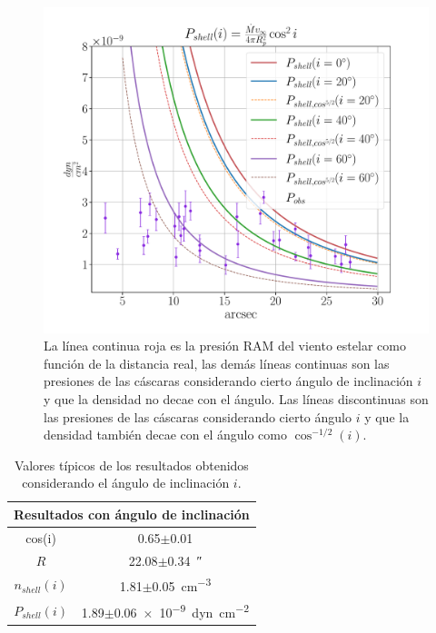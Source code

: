 \documentclass{book}
\begin{document}
\begin{figure}[htb]
    \centering
    \includegraphics[width=\textwidth]{ultimos/R_1_cos2(1).pdf}
    \caption{La línea continua roja es la presión RAM del viento estelar como función de la distancia real, las demás líneas continuas son las presiones de las cáscaras considerando cierto ángulo de inclinación $i$ y que la densidad no decae con el ángulo. Las líneas discontinuas son las presiones de las cáscaras considerando cierto ángulo $i$ y que la densidad también decae con el ángulo como $\cos^{-1/2}(i)$.}
    \label{fig:ncos_2}
\end{figure}

\begin{table}[htb]
    \centering
    \begin{tabular}{c c}
        \toprule
        \multicolumn{2}{c}{Resultados con ángulo de inclinación} \\ \midrule
         cos(i) & 0.65$\pm$0.01 \\
         $R$ & 22.08$\pm$\SI{0.34}{\arcsecond}\\
         $n_{shell}(i)$ & 1.81$\pm$\SI{0.05}{cm^{-3}}\\
         $P_{shell}(i)$ & 1.89$\pm$\SI{0.06e-9}{dyn.cm^{-2}} \\
         \bottomrule
    \end{tabular}
    \caption{Valores típicos de los resultados obtenidos considerando el ángulo de inclinación $i$.}
    \label{tab:mean_i}
\end{table}
\end{document}
